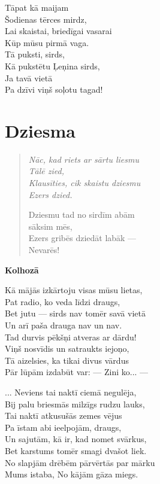 \documentclass[11pt]{article}
\begin{document}
{Tāpat kā maijam\\
Šodienas tērces mirdz,\\
Lai skaistai, briedīgai vasarai\\
Kūp mūsu pirmā vaga.\\
Tā puksti, sirds,\\
Kā pukstētu Ļeņina sirds,\\
Ja tavā vietā\\
Pa dzīvi viņš soļotu tagad!




\newpage

\section{Dziesma}

\begin{quote}
{\em
Nāc, kad riets ar sārtu liesmu\\
\mbox{}\hspace{10pt} Tālē zied,\\
Klausīties, cik skaistu dziesmu\\
\mbox{}\hspace{10pt} Ezers dzied.

Dziesmu tad no sirdīm abām\\
\mbox{}\hspace{10pt} sāksim mēs,\\
Ezers gribēs dziedāt labāk ---\\
\mbox{}\hspace{10pt} Nevarēs!
}
\end{quote}


{\bf Kolhozā}

Kā mājās izkārtoju visas mūsu lietas,\\
Pat radio, ko veda līdzi draugs,\\
Bet jutu --- sirds nav tomēr savā vietā\\
Un arī paša drauga nav un nav.\\
Tad durvis pēkšņi atveras ar dārdu!\\
Viņš nosvīdis un satraukts iejoņo,\\
Tā aizelsies, ka tikai divus vārdus\\
Pār lūpām izdabūt var: --- Zini ko... ---

... Neviens tai naktī ciemā negulēja,\\
Bij palu briesmās milzīgs rudzu lauks,\\
Tai naktī atkusušās zemes vējus\\
Pa īstam abi ieelpojām, draugs,\\
Un sajutām, kā ir, kad nomet svārkus,\\
Bet karstums tomēr smagi dvašot liek.\\
No slapjām drēbēm pārvērtās par mārku\\
Mums istaba, No kājām gāza miegs.

}
\end{document}
